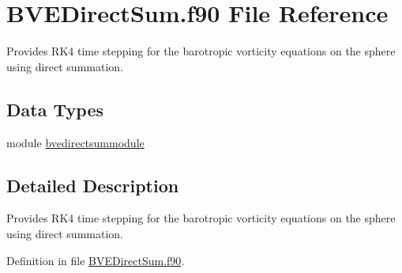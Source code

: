 \hypertarget{_b_v_e_direct_sum_8f90}{\section{B\+V\+E\+Direct\+Sum.\+f90 File Reference}
\label{_b_v_e_direct_sum_8f90}
}


Provides R\+K4 time stepping for the barotropic vorticity equations on the sphere using direct summation.  


\subsection*{Data Types}
\begin{DoxyCompactItemize}
\item 
module \hyperlink{classbvedirectsummodule}{bvedirectsummodule}
\end{DoxyCompactItemize}


\subsection{Detailed Description}
Provides R\+K4 time stepping for the barotropic vorticity equations on the sphere using direct summation. 



Definition in file \hyperlink{_b_v_e_direct_sum_8f90_source}{B\+V\+E\+Direct\+Sum.\+f90}.

